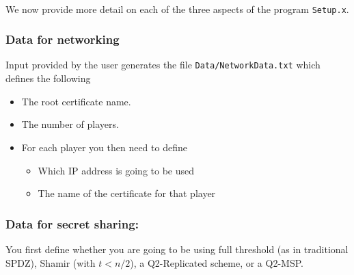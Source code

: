 ~~

\noindent We now provide more detail on each of the three aspects of the program
\verb+Setup.x+.

\subsubsection{Data for networking}
Input provided by the user generates the file
\verb+Data/NetworkData.txt+ which defines the following
\begin{itemize}
\item The root certificate name.
\item The number of players.
\item For each player you then need to define
\begin{itemize}
  \item Which IP address is going to be used
  \item The name of the certificate for that player
\end{itemize}
\iffalse XXXX
\item Whether a fake offline phase is going to be used.
\item Whether a fake sacrifice phase is going to be used.
\fi
\end{itemize}

\subsubsection{Data for secret sharing:}
You first define whether you are going to be using full threshold (as in
traditional SPDZ), Shamir (with $t<n/2$), a Q2-Replicated scheme, or
a Q2-MSP.

